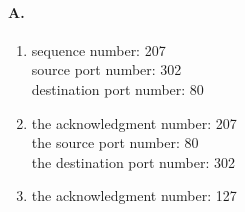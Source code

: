 \paragraph{A.}
\begin{enumerate}
	\item 
	sequence number: 207 \\
	source port number: 302 \\
	destination port number: 80
	
	\item 
	the acknowledgment number: 207\\
	the source port number: 80\\
	the destination port number: 302
	
	\item the acknowledgment number: 127
	

\end{enumerate}
